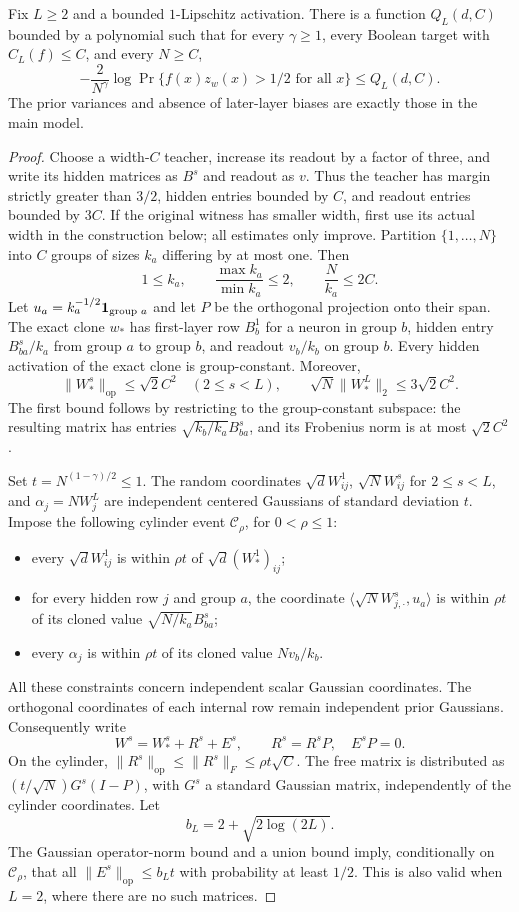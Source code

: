 \begin{proposition}
Fix $L\geq2$ and a bounded $1$-Lipschitz activation. There is a function $Q_L(d,C)$ bounded by a polynomial such that for every $\gamma\geq1$, every Boolean target with
$C_L(f)\leq C$, and every $N\geq C$,
\[
 -\frac{2}{N^\gamma}\log\Pr\{f(x)z_w(x)>1/2\text{ for all }x\}
 \leq Q_L(d,C).
\]
The prior variances and absence of later-layer biases are exactly those in the
main model.
\end{proposition}
\begin{proof}
Choose a width-$C$ teacher, increase its readout by a factor of three, and write
its hidden matrices as $B^s$ and readout as $v$. Thus the teacher has margin
strictly greater than $3/2$, hidden entries bounded by $C$, and readout entries
bounded by $3C$. If the original witness has smaller width, first use its actual
width in the construction below; all estimates only improve.
Partition $\{1,\ldots,N\}$ into $C$ groups of sizes $k_a$ differing by at most
one. Then
\[
 1\leq k_a,\qquad \frac{\max k_a}{\min k_a}\leq2,
 \qquad \frac N{k_a}\leq2C.
\]
Let $u_a=k_a^{-1/2}{\bf1}_{\text{group }a}$ and let $P$ be the orthogonal
projection onto their span. The exact clone $w_*$ has first-layer row $B^1_b$
for a neuron in group $b$, hidden entry $B^s_{ba}/k_a$ from group $a$ to group
$b$, and readout $v_b/k_b$ on group $b$. Every hidden activation of the exact
clone is group-constant. Moreover,
\[
 \|W_*^s\|_{\mathrm{op}}\leq\sqrt2 C^2\quad(2\leq s<L),
 \qquad \sqrt N\|W_*^L\|_2\leq3\sqrt2 C^2.
\]
The first bound follows by restricting to the group-constant subspace: the
resulting matrix has entries $\sqrt{k_b/k_a}B^s_{ba}$, and its Frobenius norm
is at most $\sqrt2 C^2$.

Set $t=N^{(1-\gamma)/2}\leq1$. The random coordinates
$\sqrt d W^1_{ij}$, $\sqrt N W^s_{ij}$ for $2\leq s<L$, and
$\alpha_j=NW^L_j$ are independent centered Gaussians of standard deviation
$t$. Impose the following cylinder event $\mathcal C_\rho$, for
$0<\rho\leq1$:
\begin{itemize}
\item every $\sqrt d W^1_{ij}$ is within $\rho t$ of
$\sqrt d (W_*^1)_{ij}$;
\item for every hidden row $j$ and group $a$, the coordinate
$\langle\sqrt N W^s_{j,\cdot},u_a\rangle$ is within $\rho t$ of its
cloned value $\sqrt{N/k_a}B^s_{ba}$;
\item every $\alpha_j$ is within $\rho t$ of its cloned value $Nv_b/k_b$.
\end{itemize}
All these constraints concern independent scalar Gaussian coordinates.
The orthogonal coordinates of each internal row remain independent prior
Gaussians. Consequently write
\[
 W^s=W_*^s+R^s+E^s,\qquad R^s=R^sP,\quad E^sP=0.
\]
On the cylinder, $\|R^s\|_{\mathrm{op}}\leq\|R^s\|_F\leq\rho t\sqrt C$.
The free matrix is distributed as $(t/\sqrt N)G^s(I-P)$, with $G^s$ a standard
Gaussian matrix, independently of the cylinder coordinates. Let
\[
 b_L=2+\sqrt{2\log(2L)}.
\]
The Gaussian operator-norm bound and a union bound imply, conditionally on
$\mathcal C_\rho$, that all $\|E^s\|_{\mathrm{op}}\leq b_Lt$ with probability
at least $1/2$. This is also valid when $L=2$, where there are no such matrices.


\end{proof}
